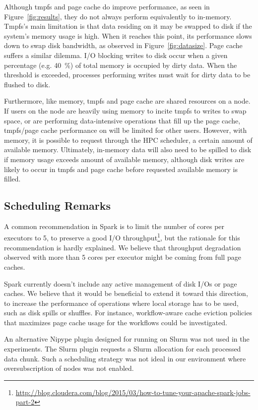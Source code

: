 \documentclass{IEEEtran}
\begin{document}
Although tmpfs and page cache do improve performance, as seen in
Figure~\ref{fig:results}, they do not always perform equivalently to in-memory. 
Tmpfs's main limitation is that data residing on it may be swapped to disk if 
the system's memory usage is high. When it reaches this point, its performance 
slows down to swap disk bandwidth, as observed in Figure~\ref{fig:datasize}. Page cache suffers a similar dilemma. I/O blocking writes to disk occur when a given percentage (e.g. 40~\%)
of total memory is occupied by dirty data. When the threshold is exceeded,
processes performing writes must wait for dirty data to be flushed to disk.

Furthermore, like memory, tmpfs and page cache are shared resources on a node.
If users on the node are heavily using memory to incite tmpfs to writes to swap space, or are performing data-intensive operations
that fill up the page cache, tmpfs/page cache performance on will be limited for other users. 
However, with memory, it is possible to request through the HPC scheduler, a certain
amount of available memory. Ultimately, in-memory data will also need to be spilled to
disk if memory usage exceeds amount of available memory, although disk writes are 
likely to occur in tmpfs and page cache before requested available memory is filled.

\subsection{Scheduling Remarks}

A common recommendation in Spark is to limit the number of cores per 
executors to 5, to preserve a good I/O 
throughput\footnote{\url{http://blog.cloudera.com/blog/2015/03/how-to-tune-your-apache-spark-jobs-part-2}}, 
but the rationale for this recommendation is hardly explained. We 
believe that throughput degradation observed with more than 5 cores per 
executor might be coming from full page caches.

Spark currently doesn't include any active management of disk I/Os or 
page caches. We believe that it would be beneficial to extend it toward 
this direction, to increase the performance of operations where local 
storage has to be used, such as disk spills or shuffles. For instance, 
workflow-aware cache eviction policies that maximizes page cache usage 
for the workflows could be investigated. 

An alternative Nipype plugin designed for running on Slurm was not used 
in the experiments. The Slurm plugin requests a Slurm allocation for 
each processed data chunk. Such a scheduling strategy was not ideal in 
our environment where oversubscription of nodes was not enabled.
\end{document}
